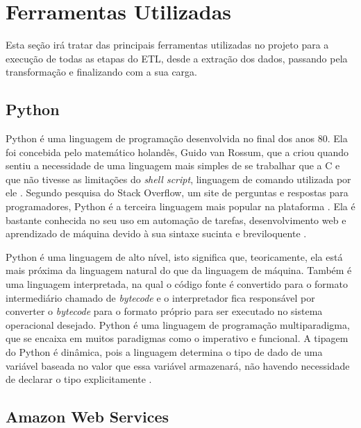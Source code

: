 \section{Ferramentas Utilizadas}
\label{sec:ferramentas}
Esta seção irá tratar das principais ferramentas utilizadas no projeto para a execução de todas as etapas do ETL, desde a extração dos dados, passando pela transformação e finalizando com a sua carga.

\subsection{Python}
\label{subsec:python}
Python é uma linguagem de programação desenvolvida no final dos anos 80. Ela foi concebida pelo matemático holandês, Guido van Rossum, que a criou quando sentiu a necessidade de uma linguagem mais simples de se trabalhar que a C e que não tivesse as limitações do \textit{shell script}, linguagem de comando utilizada por ele \cite{de2020python}. Segundo pesquisa do Stack Overflow, um site de perguntas e respostas para programadores, Python é a terceira linguagem mais popular na plataforma \cite{stackoverflow:survey}. Ela é bastante conhecida no seu uso em automação de tarefas, desenvolvimento web e aprendizado de máquina devido à sua sintaxe sucinta e breviloquente \cite{de2020python}.

Python é uma linguagem de alto nível, isto significa que, teoricamente, ela está mais próxima da linguagem natural do que da linguagem de máquina. Também é uma linguagem interpretada, na qual o código fonte é convertido para o formato intermediário chamado de \textit{bytecode} e o interpretador fica responsável por converter o \textit{bytecode} para o formato próprio para ser executado no sistema operacional desejado. Python é uma linguagem de programação multiparadigma, que se encaixa em muitos paradigmas como o imperativo e funcional. A tipagem do Python é dinâmica, pois a linguagem determina o tipo de dado de uma variável baseada no valor que essa variável armazenará, não havendo necessidade de declarar o tipo explicitamente \cite{de2020python}.


\subsection{Amazon Web Services}
\label{subsec:aws}


